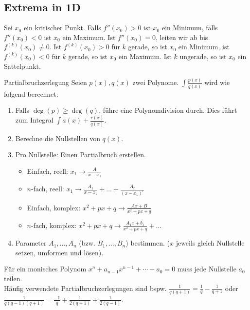 \documentclass[a4paper,10pt]{article}
\begin{document}
\subsection{Extrema in 1D}

Sei $x_0$ ein kritischer Punkt. Falls $f''(x_0) > 0$ ist $x_0$ ein Minimum, falls $f''(x_0) < 0$ ist $x_0$ ein Maximum. Ist $f''(x_0) = 0$, leiten wir ab bis $f^{(k)}(x_0) \neq 0$. Ist $f^{(k)}(x_0) > 0$ für $k$ gerade, so ist $x_0$ ein Minimum, ist $f^{(k)}(x_0) < 0$ für $k$ gerade, so ist $x_0$ ein Maximum. Ist $k$ ungerade, so ist $x_0$ ein Sattelpunkt.

\begin{mainbox}{Partialbruchzerlegung}
  Seien $p(x), q(x)$ zwei Polynome. $\int \frac{p(x)}{q(x)}$ wird wie folgend berechnet:
  \begin{enumerate}
   \item Falls $\deg(p) \ge \deg(q)$, führe eine Polynomdivision durch. Dies führt zum Integral $\int a(x) + \frac{r(x)}{q(x)}$.
   \item Berechne die Nullstellen von $q(x)$.
   \item Pro Nullstelle: Einen Partialbruch erstellen.
   \begin{itemize}[left=0pt]
    \item Einfach, reell: $x_1 \to \frac{A}{x - x_1}$
    \item $n$-fach, reell: $x_1 \to \frac{A_1}{x - x_1} + \ldots + \frac{A_r}{(x-x_1)^r}$ 
    \item Einfach, komplex: $x^2 + px + q \to \frac{Ax + B} {x^2 + px + q}$
    \item $n$-fach, komplex: $x^2 + px + q \to \frac{A_1x+b_1}{x^2+px+q} + \ldots$
   \end{itemize}
   \item Parameter $A_1, \ldots, A_n$ (bzw. $B_1, \ldots, B_n$) bestimmen. ($x$ jeweils gleich Nullstelle setzen, umformen und lösen).
 
  \end{enumerate}
 \end{mainbox}

Für ein monisches Polynom $x^n + a_{n-1} x^{n-1} + \cdots + a_0 = 0$ muss jede Nullstelle $a_0$ teilen.\\

Häufig verwendete Partialbruchzerlegungen sind bspw. $\frac{1}{q(q+1)} = \frac{1}{q} - \frac{1}{q + 1}$ oder $\frac{1}{q(q-1)(q+1)} = \frac{-1}{q} + \frac{1}{2(q+1)} + \frac{1}{2(q-1)}$.
\end{document}
